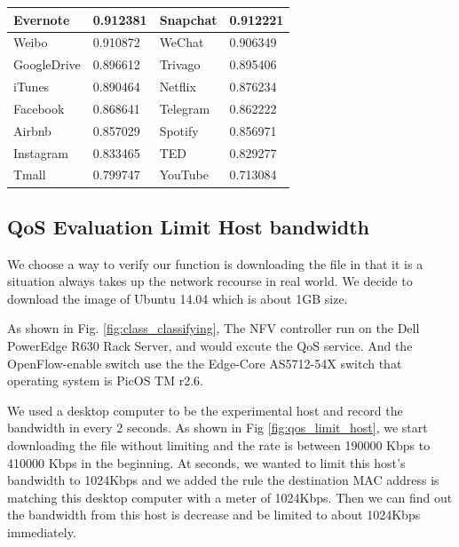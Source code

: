 \documentclass[journal]{IEEEtran}
\begin{document}
\begin{table}[!t]
\begin{tabular}{|l|l|l|l|}
Evernote            & 0.912381            & Snapchat          & 0.912221            \\ \hline
Weibo               & 0.910872            & WeChat            & 0.906349            \\ \hline
GoogleDrive         & 0.896612            & Trivago           & 0.895406             \\ \hline
iTunes              & 0.890464            & Netflix           & 0.876234             \\ \hline
Facebook            & 0.868641            & Telegram          & 0.862222             \\ \hline
Airbnb              & 0.857029            & Spotify           & 0.856971             \\ \hline
Instagram           & 0.833465            & TED               & 0.829277             \\ \hline
Tmall               & 0.799747            & YouTube           & 0.713084             \\ \hline
\end{tabular}
\end{table}

\subsection{QoS Evaluation Limit Host bandwidth}

We choose a way to verify our function is downloading the file in that it is a situation always takes up the network recourse in real world. We decide to download the image of Ubuntu 14.04 which is about 1GB size.

As shown in Fig. \ref{fig:class_classifying}, The NFV controller run on the Dell PowerEdge R630 Rack Server, and would excute the QoS service. And the OpenFlow-enable switch use the the Edge-Core AS5712-54X\cite{edge-core-switch} switch that operating system is PicOS TM r2.6.

We used a desktop computer to be the experimental host and record the bandwidth in every 2 seconds. As shown in Fig \ref{fig:qos_limit_host}, we start downloading the file without limiting and the rate is between 190000 Kbps to 410000 Kbps in the beginning.
At  seconds, we wanted to limit this host’s bandwidth to 1024Kbps and we added the rule the destination MAC address is matching this desktop computer with a meter of 1024Kbps. Then we can find out the bandwidth from this host is decrease and be limited to about 1024Kbps immediately.
\end{document}
